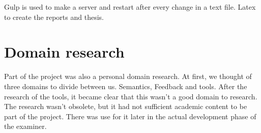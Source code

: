 Gulp is used to make a server and restart after every change in a text file.
Latex to create the reports and thesis.

\section{Domain research}
Part of the project was also a personal domain research. At first, we thought of
three domains to divide between us.
Semantics, Feedback and tools.
After the research of the tools, it became clear that this wasn't a good domain
to research.
The research wasn't obsolete, but it had not sufficient academic content to be
part of the project.
There was use for it later in the actual development phase of the \gls{examiner}.
